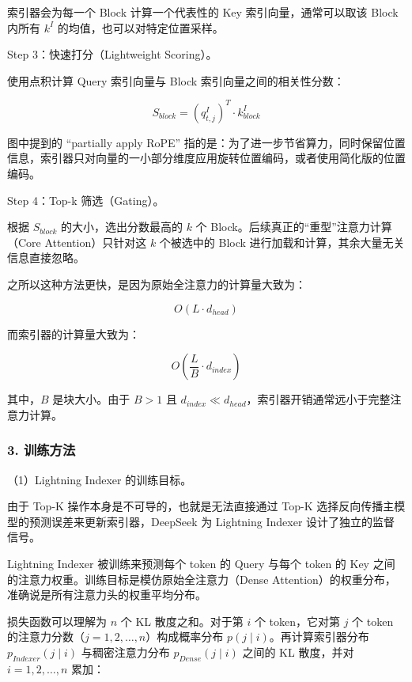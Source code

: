 索引器会为每一个 Block 计算一个代表性的 Key 索引向量，通常可以取该 Block 内所有 \(k^I\) 的均值，也可以对特定位置采样。

Step 3：快速打分（Lightweight Scoring）。

使用点积计算 Query 索引向量与 Block 索引向量之间的相关性分数：

\[
S_{block} = (q^I_{t,j})^T \cdot k^I_{block}
\]

图中提到的 ``partially apply RoPE'' 指的是：为了进一步节省算力，同时保留位置信息，索引器只对向量的一小部分维度应用旋转位置编码，或者使用简化版的位置编码。

Step 4：Top-k 筛选（Gating）。

根据 \(S_{block}\) 的大小，选出分数最高的 \(k\) 个 Block。后续真正的``重型''注意力计算（Core Attention）只针对这 \(k\) 个被选中的 Block 进行加载和计算，其余大量无关信息直接忽略。

之所以这种方法更快，是因为原始全注意力的计算量大致为：

\[
O(L \cdot d_{head})
\]

而索引器的计算量大致为：

\[
O\left(\frac{L}{B} \cdot d_{index}\right)
\]

其中，\(B\) 是块大小。由于 \(B > 1\) 且 \(d_{index} \ll d_{head}\)，索引器开销通常远小于完整注意力计算。

\hypertarget{ux8badux7ec3ux65b9ux6cd5}{%
\subsubsection{3. 训练方法}\label{ux8badux7ec3ux65b9ux6cd5}}

（1）Lightning Indexer 的训练目标。

由于 Top-K 操作本身是不可导的，也就是无法直接通过 Top-K 选择反向传播主模型的预测误差来更新索引器，DeepSeek 为 Lightning Indexer 设计了独立的监督信号。

Lightning Indexer 被训练来预测每个 token 的 Query 与每个 token 的 Key 之间的注意力权重。训练目标是模仿原始全注意力（Dense Attention）的权重分布，准确说是所有注意力头的权重平均分布。

损失函数可以理解为 \(n\) 个 KL 散度之和。对于第 \(i\) 个 token，它对第 \(j\) 个 token 的注意力分数（\(j = 1, 2, \ldots, n\)）构成概率分布 \(p(j \mid i)\)。再计算索引器分布 \(p_{Indexer}(j \mid i)\) 与稠密注意力分布 \(p_{Dense}(j \mid i)\) 之间的 KL 散度，并对 \(i = 1, 2, \ldots, n\) 累加：

